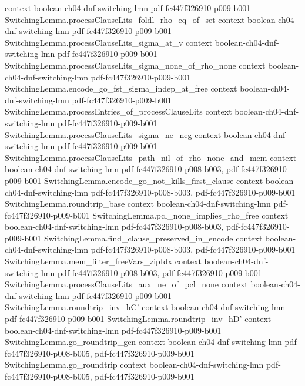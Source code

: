 \begin{lemma}
  {context}
  {boolean-ch04-dnf-switching-lmn}
  {pdf-fc447f326910-p009-b001}
\proofstep
  {SwitchingLemma.processClauseLits_foldl_rho_eq_of_set}
  {context}
  {boolean-ch04-dnf-switching-lmn}
  {pdf-fc447f326910-p009-b001}
\proofstep
  {SwitchingLemma.processClauseLits_sigma_at_v}
  {context}
  {boolean-ch04-dnf-switching-lmn}
  {pdf-fc447f326910-p009-b001}
\proofstep
  {SwitchingLemma.processClauseLits_sigma_none_of_rho_none}
  {context}
  {boolean-ch04-dnf-switching-lmn}
  {pdf-fc447f326910-p009-b001}
\proofstep
  {SwitchingLemma.encode_go_fst_sigma_indep_at_free}
  {context}
  {boolean-ch04-dnf-switching-lmn}
  {pdf-fc447f326910-p009-b001}
\proofstep
  {SwitchingLemma.processEntries_of_processClauseLits}
  {context}
  {boolean-ch04-dnf-switching-lmn}
  {pdf-fc447f326910-p009-b001}
\proofstep
  {SwitchingLemma.processClauseLits_sigma_ne_neg}
  {context}
  {boolean-ch04-dnf-switching-lmn}
  {pdf-fc447f326910-p009-b001}
\proofstep
  {SwitchingLemma.processClauseLits_path_nil_of_rho_none_and_mem}
  {context}
  {boolean-ch04-dnf-switching-lmn}
  {pdf-fc447f326910-p008-b003,
    pdf-fc447f326910-p009-b001}
\proofstep
  {SwitchingLemma.encode_go_not_kills_first_clause}
  {context}
  {boolean-ch04-dnf-switching-lmn}
  {pdf-fc447f326910-p008-b003,
    pdf-fc447f326910-p009-b001}
\proofstep
  {SwitchingLemma.roundtrip_base}
  {context}
  {boolean-ch04-dnf-switching-lmn}
  {pdf-fc447f326910-p009-b001}
\proofstep
  {SwitchingLemma.pcl_none_implies_rho_free}
  {context}
  {boolean-ch04-dnf-switching-lmn}
  {pdf-fc447f326910-p008-b003,
    pdf-fc447f326910-p009-b001}
\proofstep
  {SwitchingLemma.find_clause_preserved_in_encode}
  {context}
  {boolean-ch04-dnf-switching-lmn}
  {pdf-fc447f326910-p008-b003,
    pdf-fc447f326910-p009-b001}
\proofstep
  {SwitchingLemma.mem_filter_freeVars_zipIdx}
  {context}
  {boolean-ch04-dnf-switching-lmn}
  {pdf-fc447f326910-p008-b003,
    pdf-fc447f326910-p009-b001}
\proofstep
  {SwitchingLemma.processClauseLits_aux_ne_of_pcl_none}
  {context}
  {boolean-ch04-dnf-switching-lmn}
  {pdf-fc447f326910-p009-b001}
\proofstep
  {SwitchingLemma.roundtrip_inv_hC'}
  {context}
  {boolean-ch04-dnf-switching-lmn}
  {pdf-fc447f326910-p009-b001}
\proofstep
  {SwitchingLemma.roundtrip_inv_hD'}
  {context}
  {boolean-ch04-dnf-switching-lmn}
  {pdf-fc447f326910-p009-b001}
\proofstep
  {SwitchingLemma.go_roundtrip_gen}
  {context}
  {boolean-ch04-dnf-switching-lmn}
  {pdf-fc447f326910-p008-b005,
    pdf-fc447f326910-p009-b001}
\proofstep
  {SwitchingLemma.go_roundtrip}
  {context}
  {boolean-ch04-dnf-switching-lmn}
  {pdf-fc447f326910-p008-b005,
    pdf-fc447f326910-p009-b001}

\end{lemma}
